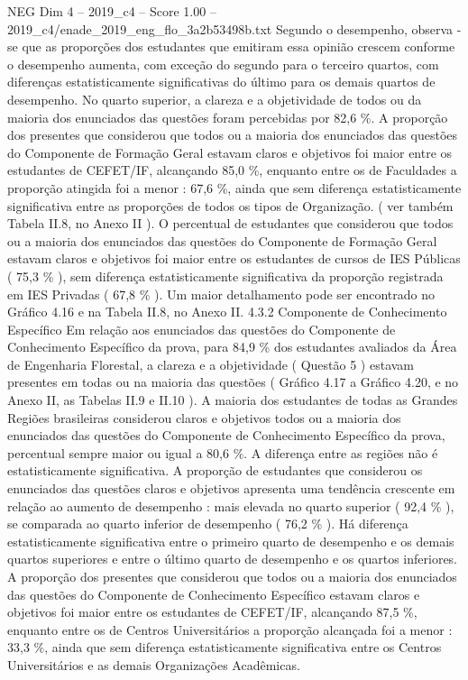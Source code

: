 \begin{textsample}{NEG Dim 4 – 2019\_c4 – Score 1.00 – 2019\_c4/enade\_2019\_eng\_flo\_3a2b53498b.txt}
Segundo o desempenho, observa -se que as proporções dos estudantes que emitiram essa opinião crescem conforme o desempenho aumenta, com exceção do segundo para o terceiro quartos, com diferenças estatisticamente significativas do último para os demais quartos de desempenho.
No quarto superior, a clareza e a objetividade de todos ou da maioria dos enunciados das questões foram percebidas por 82,6 \%.
A proporção dos presentes que considerou que todos ou a maioria dos enunciados das questões do Componente de Formação Geral estavam claros e objetivos foi maior entre os estudantes de CEFET/IF, alcançando 85,0 \%, enquanto entre os de Faculdades a proporção atingida foi a menor : 67,6 \%, ainda que sem diferença estatisticamente significativa entre as proporções de todos os tipos de Organização. ( ver também Tabela II.8, no Anexo II ).
O percentual de estudantes que considerou que todos ou a maioria dos enunciados das questões do Componente de Formação Geral estavam claros e objetivos foi maior entre os estudantes de cursos de IES Públicas ( 75,3 \% ), sem diferença estatisticamente significativa da proporção registrada em IES Privadas ( 67,8 \% ).
Um maior detalhamento pode ser encontrado no Gráfico 4.16 e na Tabela II.8, no Anexo II. 4.3.2 Componente de Conhecimento Específico Em relação aos enunciados das questões do Componente de Conhecimento Específico da prova, para 84,9 \% dos estudantes avaliados da Área de Engenharia Florestal, a clareza e a objetividade ( Questão 5 ) estavam presentes em todas ou na maioria das questões ( Gráfico 4.17 a Gráfico 4.20, e no Anexo II, as Tabelas II.9 e II.10 ).
A maioria dos estudantes de todas as Grandes Regiões brasileiras considerou claros e objetivos todos ou a maioria dos enunciados das questões do Componente de Conhecimento Específico da prova, percentual sempre maior ou igual a 80,6 \%.
A diferença entre as regiões não é estatisticamente significativa.
A proporção de estudantes que considerou os enunciados das questões claros e objetivos apresenta uma tendência crescente em relação ao aumento de desempenho : mais elevada no quarto superior ( 92,4 \% ), se comparada ao quarto inferior de desempenho ( 76,2 \% ).
Há diferença estatisticamente significativa entre o primeiro quarto de desempenho e os demais quartos superiores e entre o último quarto de desempenho e os quartos inferiores.
A proporção dos presentes que considerou que todos ou a maioria dos enunciados das questões do Componente de Conhecimento Específico estavam claros e objetivos foi maior entre os estudantes de CEFET/IF, alcançando 87,5 \%, enquanto entre os de Centros Universitários a proporção alcançada foi a menor : 33,3 \%, ainda que sem diferença estatisticamente significativa entre os Centros Universitários e as demais Organizações Acadêmicas.

\end{textsample}
